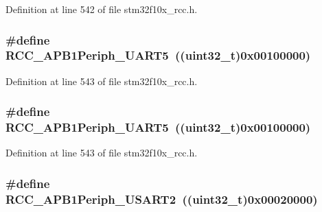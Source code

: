 Definition at line 542 of file stm32f10x\+\_\+rcc.\+h.

\subsubsection[{\texorpdfstring{R\+C\+C\+\_\+\+A\+P\+B1\+Periph\+\_\+\+U\+A\+R\+T5}{RCC_APB1Periph_UART5}}]{\setlength{\rightskip}{0pt plus 5cm}\#define R\+C\+C\+\_\+\+A\+P\+B1\+Periph\+\_\+\+U\+A\+R\+T5~(({\bf uint32\+\_\+t})0x00100000)}\hypertarget{group___a_p_b1__peripheral_gaa00c73f88a7af45fb29df97b07acd856}{}\label{group___a_p_b1__peripheral_gaa00c73f88a7af45fb29df97b07acd856}


Definition at line 543 of file stm32f10x\+\_\+rcc.\+h.

\subsubsection[{\texorpdfstring{R\+C\+C\+\_\+\+A\+P\+B1\+Periph\+\_\+\+U\+A\+R\+T5}{RCC_APB1Periph_UART5}}]{\setlength{\rightskip}{0pt plus 5cm}\#define R\+C\+C\+\_\+\+A\+P\+B1\+Periph\+\_\+\+U\+A\+R\+T5~(({\bf uint32\+\_\+t})0x00100000)}\hypertarget{group___a_p_b1__peripheral_gaa00c73f88a7af45fb29df97b07acd856}{}\label{group___a_p_b1__peripheral_gaa00c73f88a7af45fb29df97b07acd856}


Definition at line 543 of file stm32f10x\+\_\+rcc.\+h.

\subsubsection[{\texorpdfstring{R\+C\+C\+\_\+\+A\+P\+B1\+Periph\+\_\+\+U\+S\+A\+R\+T2}{RCC_APB1Periph_USART2}}]{\setlength{\rightskip}{0pt plus 5cm}\#define R\+C\+C\+\_\+\+A\+P\+B1\+Periph\+\_\+\+U\+S\+A\+R\+T2~(({\bf uint32\+\_\+t})0x00020000)}\hypertarget{group___a_p_b1__peripheral_gaa69c77220b943a42a4bacb8a3bf87dd0}{}\label{group___a_p_b1__peripheral_gaa69c77220b943a42a4bacb8a3bf87dd0}



